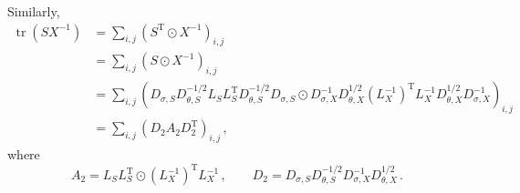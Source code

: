 \documentclass[12pt]{article}
\DeclareMathOperator{\tr}{tr}
\newcommand{\transpose}[1]{#1^{\mathrm{T}}}
\begin{document}
Similarly,
\begin{equation}
\begin{aligned}
\tr(S X^{-1})
  &= \sum_{i,j} (\transpose{S} \odot X^{-1})_{i,j} \\
  &= \sum_{i,j} (S \odot X^{-1})_{i,j} \\
  &= \sum_{i,j} (D_{\sigma,S} D_{\theta,S}^{-1/2} L_{S} \transpose{L_{S}} D_{\theta,S}^{-1/2} D_{\sigma,S} \odot D_{\sigma,X}^{-1} D_{\theta,X}^{1/2} \transpose{(L_{X}^{-1})} L_{X}^{-1} D_{\theta,X}^{1/2} D_{\sigma,X}^{-1})_{i,j} \\
  &= \sum_{i,j} (D_{2} A_{2} \transpose{D_{2}})_{i,j}\,,
\end{aligned}
\end{equation}
where
\begin{equation}
A_{2} = L_{S} \transpose{L_{S}} \odot \transpose{(L_{X}^{-1})} L_{X}^{-1}\,,\qquad D_{2} = D_{\sigma,S} D_{\theta,S}^{-1/2} D_{\sigma,X}^{-1} D_{\theta,X}^{1/2}\,.
\end{equation}
\end{document}
